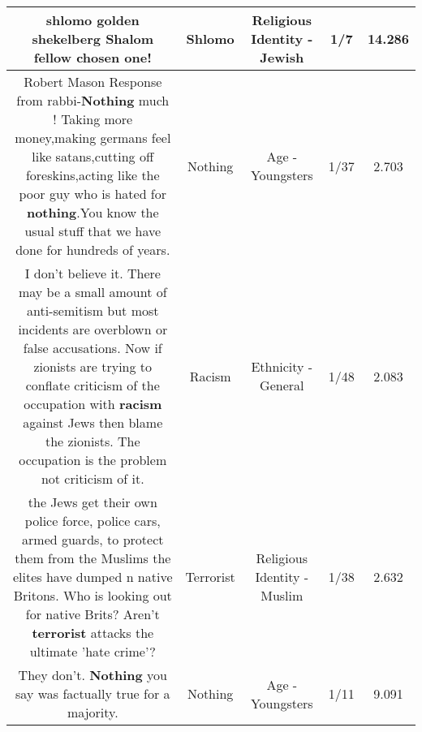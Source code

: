\documentclass[11pt]{article}
\newlength\mylength
\begin{document}
\begin{center}
\begin{longtable}{|C{.65\mylength}|C{.30\mylength}|C{.12\mylength}|C{.12\mylength}|C{.12\mylength}|}
  \small shlomo golden shekelberg Shalom fellow chosen one!\normalsize   & Shlomo & Religious Identity - Jewish & 1/7 & 14.286 \\  \hline
  \small Robert Mason Response from rabbi-\textbf{Nothing} much ! Taking more money,making germans feel like satans,cutting off foreskins,acting like the poor guy who is hated for \textbf{nothing}.You know the usual stuff that we have done for hundreds of years.\normalsize   & Nothing & Age - Youngsters & 1/37 & 2.703 \\  \hline
  \small I don't believe it. There may be a small amount of anti-semitism but most incidents are overblown or false accusations. Now if zionists are trying to conflate criticism of the occupation with \textbf{racism} against Jews then blame the zionists. The occupation is the problem not criticism of it.\normalsize   & Racism & Ethnicity - General & 1/48 & 2.083 \\  \hline
  \small the Jews get their own police force, police cars, armed guards, to protect them from the Muslims the elites have dumped n native Britons. Who is looking out for native Brits? Aren't \textbf{terrorist} attacks the ultimate 'hate crime'?\normalsize   & Terrorist & Religious Identity - Muslim & 1/38 & 2.632 \\  \hline
  \small They don't. \textbf{Nothing} you say was factually true for a majority.\normalsize   & Nothing & Age - Youngsters & 1/11 & 9.091 \\  \hline

\end{longtable}
\end{center}
\end{document}
